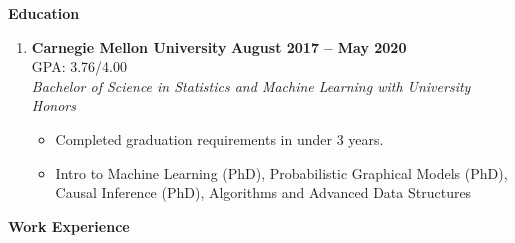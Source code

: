 \documentclass[letterpaper,11pt]{article}
\makeatletter
\newlength{\outerbordwidth}
\newcommand{\resitem}[1]{\item #1 \vspace{-2pt}}
\newcommand{\resheading}[1]{\vspace{0pt} %
  \parbox{\textwidth}{\setlength{\FrameSep}{\outerbordwidth}
    \begin{shaded}
\setlength{\fboxsep}{0pt}\framebox[\textwidth][l]{\setlength{\fboxsep}{3.5pt}\fcolorbox{shadecolorB}{shadecolorB}{\textbf{\sffamily{\mbox{~}\makebox[7.262in][l]{\large #1} \vphantom{p\^{E}}}}}} %
    \end{shaded}
  }\vspace{-7pt} %
}
\newcommand{\ressubheading}[5]{
\begin{tabular*}{6.8in}{l@{\cftdotfill{\cftsecdotsep}\extracolsep{\fill}}r}
		\textbf{#1} & {#2} \\
		{#3} \\
		\textit{#4} \\
		\textit{#5} \\
\end{tabular*}\vspace{-6pt}}
\makeatother
\begin{document}
\vspace{-0.18in}

\begin{mybox}
	\hspace{-8pt} \textbf{Education}
\end{mybox}


\vspace{-10pt}
\begin{enumerate}[leftmargin=10pt]

	\item[] \textbf{Carnegie Mellon University} \cftdotfill{\cftdotsep} \textbf{\textcolor{myGreen}{August 2017 --} May 2020}\\
	GPA: 3.76/4.00 \\
	\textit{Bachelor of Science in Statistics and Machine Learning with University Honors} \\
	\vspace{-0.3pt}

	\vspace{-4pt}	
	\begin{itemize}
		\resitem{Completed graduation requirements in under 3 years.}
		\resitem{Intro to Machine Learning (PhD), Probabilistic Graphical Models (PhD), Causal Inference (PhD), Algorithms and Advanced Data Structures}
	\end{itemize}
	
\end{enumerate}

\vspace{-10pt}

\begin{mybox}
	\hspace{-8pt} \textbf{Work Experience}
\end{mybox}
\end{document}

